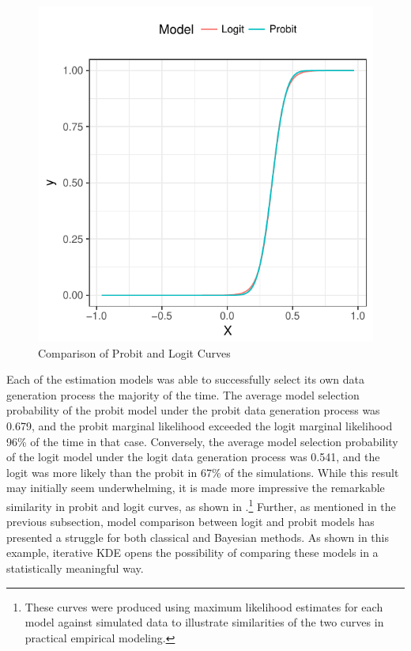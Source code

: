 \documentclass[twocolumn]{article}
\begin{document}
\begin{figure}
	\centering
	\includegraphics[width=\linewidth]{Probit-Logit-Fitted.pdf}
	\caption{Comparison of Probit and Logit Curves}
	\label{fig:Probit-Logit-Fit}
\end{figure}

Each of the estimation models was able to successfully select its own data generation process the majority of the time. The average model selection probability of the probit model under the probit data generation process was 0.679, and the probit marginal likelihood exceeded the logit marginal likelihood 96\% of the time in that case. Conversely, the average model selection probability of the logit model under the logit data generation process was 0.541, and the logit was more likely than the probit in 67\% of the simulations. While this result may initially seem underwhelming, it is made more impressive the remarkable similarity in probit and logit curves, as shown in .\footnote{These curves were produced using maximum likelihood estimates for each model against simulated data to illustrate similarities of the two curves in practical empirical modeling.}  Further, as mentioned in the previous subsection, model comparison between logit and probit models has presented a struggle for both classical and Bayesian methods. As shown in this example, iterative KDE opens the possibility of comparing these models in a statistically meaningful way.
\end{document}
